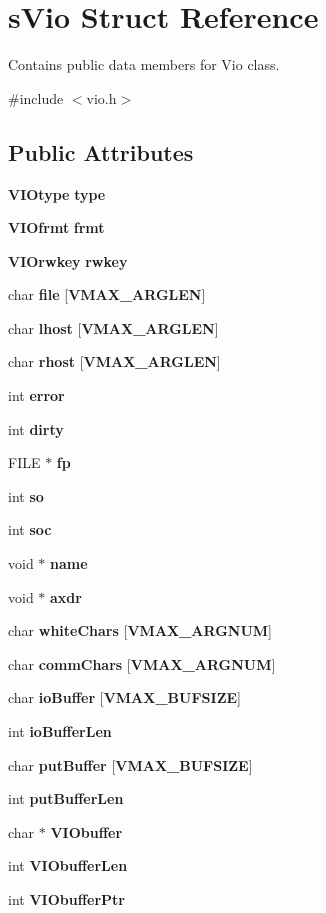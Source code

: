 \section{s\-Vio Struct Reference}
\label{a00002}


Contains public data members for Vio class.  




{\ttfamily \#include $<$vio.\-h$>$}

\subsection*{Public Attributes}
\begin{DoxyCompactItemize}
\item 
{\bf V\-I\-Otype} {\bf type}
\item 
{\bf V\-I\-Ofrmt} {\bf frmt}
\item 
{\bf V\-I\-Orwkey} {\bf rwkey}
\item 
char {\bf file} [{\bf V\-M\-A\-X\-\_\-\-A\-R\-G\-L\-E\-N}]
\item 
char {\bf lhost} [{\bf V\-M\-A\-X\-\_\-\-A\-R\-G\-L\-E\-N}]
\item 
char {\bf rhost} [{\bf V\-M\-A\-X\-\_\-\-A\-R\-G\-L\-E\-N}]
\item 
int {\bf error}
\item 
int {\bf dirty}
\item 
F\-I\-L\-E $\ast$ {\bf fp}
\item 
int {\bf so}
\item 
int {\bf soc}
\item 
void $\ast$ {\bf name}
\item 
void $\ast$ {\bf axdr}
\item 
char {\bf white\-Chars} [{\bf V\-M\-A\-X\-\_\-\-A\-R\-G\-N\-U\-M}]
\item 
char {\bf comm\-Chars} [{\bf V\-M\-A\-X\-\_\-\-A\-R\-G\-N\-U\-M}]
\item 
char {\bf io\-Buffer} [{\bf V\-M\-A\-X\-\_\-\-B\-U\-F\-S\-I\-Z\-E}]
\item 
int {\bf io\-Buffer\-Len}
\item 
char {\bf put\-Buffer} [{\bf V\-M\-A\-X\-\_\-\-B\-U\-F\-S\-I\-Z\-E}]
\item 
int {\bf put\-Buffer\-Len}
\item 
char $\ast$ {\bf V\-I\-Obuffer}
\item 
int {\bf V\-I\-Obuffer\-Len}
\item 
int {\bf V\-I\-Obuffer\-Ptr}
\end{DoxyCompactItemize}


